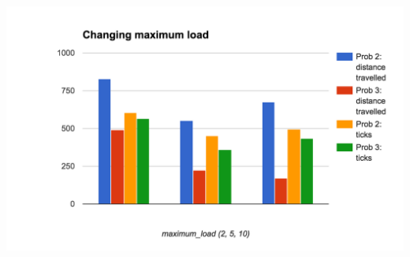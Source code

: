\documentclass[titlepage]{article}
\begin{document}
  \includegraphics[width=\textwidth,height=\textheight,keepaspectratio]{3load.png}
\end{document}
